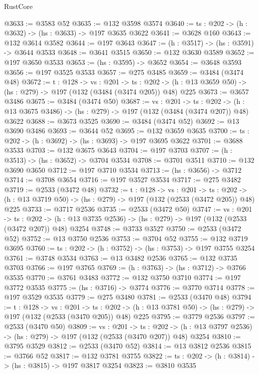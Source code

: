\begin{lexlean}{RustCore}
\begin{coremodule}
@3633 := @3583 @52
@3635 := @132 @3598 @3574
@3640 := {ts : @202} -> (h : @3632) -> (hs : @3633) -> @197 @3635 @3622
@3641 := @3628 @160
@3643 := @132 @3614 @3582
@3644 := @197 @3643
@3647 := (h : @3517) -> (hs : @3591) -> @3644 @3533
@3648 := @3641 @3515
@3650 := @132 @3630 @3589
@3652 := @197 @3650 @3533
@3653 := (hs : @3595) -> @3652
@3654 := @3648 @3593
@3656 := @197 @3525 @3533
@3657 := @275 @3485
@3659 := @3484 (@3474 @48)
@3672 := {t : @128} ->
  {vs : @201} ->
  {ts : @202} -> (h : @13 @3659 @50) -> (hs : @279) -> @197 (@132 (@3484 (@3474 @205)) @48) @225
@3673 := @3657 @3486
@3675 := @3484 (@3474 @50)
@3687 := {vs : @201} ->
  {ts : @202} -> (h : @13 @3675 @3486) -> (hs : @279) -> @197 (@132 (@3484 (@3474 @207)) @48) @3622
@3688 := @3673 @3525
@3690 := @3484 (@3474 @52)
@3692 := @13 @3690 @3486
@3693 := @3644 @52
@3695 := @132 @3659 @3635
@3700 := {ts : @202} -> (h : @3692) -> (hs : @3693) -> @197 @3695 @3622
@3701 := @3688 @3533
@3703 := @132 @3675 @3643
@3704 := @197 @3703
@3707 := (h : @3513) -> (hs : @3652) -> @3704 @3534
@3708 := @3701 @3511
@3710 := @132 @3690 @3650
@3712 := @197 @3710 @3534
@3713 := (hs : @3656) -> @3712
@3714 := @3708 @3654
@3716 := @197 @3527 @3534
@3717 := @275 @3482
@3719 := @2533 (@3472 @48)
@3732 := {t : @128} ->
  {vs : @201} ->
  {ts : @202} -> (h : @13 @3719 @50) -> (hs : @279) -> @197 (@132 (@2533 (@3472 @205)) @48) @225
@3733 := @3717 @2536
@3735 := @2533 (@3472 @50)
@3747 := {vs : @201} ->
  {ts : @202} -> (h : @13 @3735 @2536) -> (hs : @279) -> @197 (@132 (@2533 (@3472 @207)) @48) @3254
@3748 := @3733 @3527
@3750 := @2533 (@3472 @52)
@3752 := @13 @3750 @2536
@3753 := @3704 @52
@3755 := @132 @3719 @3695
@3760 := {ts : @202} -> (h : @3752) -> (hs : @3753) -> @197 @3755 @3254
@3761 := @3748 @3534
@3763 := @13 @3482 @2536
@3765 := @132 @3735 @3703
@3766 := @197 @3765
@3769 := (h : @3763) -> (hs : @3712) -> @3766 @3535
@3770 := @3761 @3483
@3772 := @132 @3750 @3710
@3774 := @197 @3772 @3535
@3775 := (hs : @3716) -> @3774
@3776 := @3770 @3714
@3778 := @197 @3529 @3535
@3779 := @275 @3480
@3781 := @2533 (@3470 @48)
@3794 := {t : @128} ->
  {vs : @201} ->
  {ts : @202} -> (h : @13 @3781 @50) -> (hs : @279) -> @197 (@132 (@2533 (@3470 @205)) @48) @225
@3795 := @3779 @2536
@3797 := @2533 (@3470 @50)
@3809 := {vs : @201} ->
  {ts : @202} -> (h : @13 @3797 @2536) -> (hs : @279) -> @197 (@132 (@2533 (@3470 @207)) @48) @3254
@3810 := @3795 @3529
@3812 := @2533 (@3470 @52)
@3814 := @13 @3812 @2536
@3815 := @3766 @52
@3817 := @132 @3781 @3755
@3822 := {ts : @202} -> (h : @3814) -> (hs : @3815) -> @197 @3817 @3254
@3823 := @3810 @3535

\end{coremodule}
\end{lexlean}
